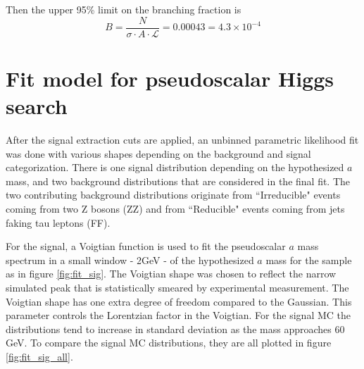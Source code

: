 Then the upper 95\% limit on the branching fraction is 
\begin{equation}B =  \frac{N}{\sigma \cdot A\cdot \mathcal{L}} = 0.00043 = 4.3 \times 10^{-4}\end{equation}



\section{Fit model for pseudoscalar Higgs search}
After the signal extraction cuts are applied, an unbinned parametric likelihood fit was done with various shapes depending on the background and signal categorization. There is one signal distribution depending on the hypothesized $a$ mass, and two background distributions that are considered in the final fit. The two contributing background distributions originate from ``Irreducible" events coming from two Z bosons (ZZ) and from ``Reducible" events coming from jets faking tau leptons (FF).  


For the signal, a Voigtian function is used to fit the pseudoscalar $a$ mass spectrum in a small window - 2GeV - of the hypothesized $a$ mass for the sample as in figure \ref{fig:fit_sig}. The Voigtian shape was chosen to reflect the narrow simulated peak that is statistically smeared by experimental measurement. The Voigtian shape has one extra degree of freedom compared to the Gaussian. This parameter controls the Lorentzian factor in the Voigtian. For the signal MC the distributions tend to increase in standard deviation as the mass approaches 60 GeV. To compare the signal MC distributions, they are all plotted in figure \ref{fig:fit_sig_all}.


